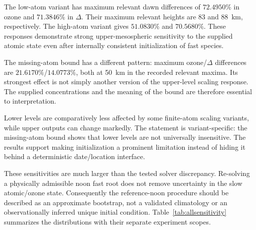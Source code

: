 The low-atom variant has maximum relevant dawn differences of $72.4950\%$ in ozone and $71.3846\%$ in $\Delta$. Their maximum relevant heights are 83 and 88~km, respectively. The high-atom variant gives $51.0830\%$ and $70.5680\%$. These responses demonstrate strong upper-mesospheric sensitivity to the supplied atomic state even after internally consistent initialization of fast species.

The missing-atom bound has a different pattern: maximum ozone/$\Delta$ differences are $21.6170\%$/$14.0773\%$, both at 50~km in the recorded relevant maxima. Its strongest effect is not simply another version of the upper-level scaling response. The supplied concentrations and the meaning of the bound are therefore essential to interpretation.


Lower levels are comparatively less affected by some finite-atom scaling variants, while upper outputs can change markedly. The statement is variant-specific: the missing-atom bound shows that lower levels are not universally insensitive. The results support making initialization a prominent limitation instead of hiding it behind a deterministic date/location interface.

These sensitivities are much larger than the tested solver discrepancy. Re-solving a physically admissible noon fast root does not remove uncertainty in the slow atomic/ozone state. Consequently the reference-noon procedure should be described as an approximate bootstrap, not a validated climatology or an observationally inferred unique initial condition.
Table~\ref{tab:allsensitivity} summarizes the distributions with their separate experiment scopes.

\clearpage
